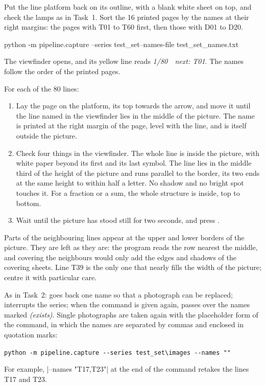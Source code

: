 Put the line platform back on its outline, with a blank white sheet on top, and check the lamps
as in Task~1. Sort the 16 printed pages by the names at their right margins: the pages with T01
to T60 first, then those with D01 to D20.

\label{st:lineseries}
\begin{pswide}
python -m pipeline.capture --series test_set\images --names-file test_set\photo_names.txt
\end{pswide}
The viewfinder opens, and its yellow line reads \emph{1/80\ \ next: T01}. The names follow the
order of the printed pages.

\label{st:oneline}
For each of the 80 lines:
\begin{enumerate}
\item Lay the page on the platform, its top towards the arrow, and move it until the line named
  in the viewfinder lies in the middle of the picture. The name is printed at the right margin
  of the page, level with the line, and is itself outside the picture.
\item Check four things in the viewfinder. The whole line is inside the picture, with white
  paper beyond its first and its last symbol. The line lies in the middle third of the height
  of the picture and runs parallel to the border, its two ends at the same height to within
  half a letter. No shadow and no bright spot touches it. For a fraction or a sum, the whole
  structure is inside, top to bottom.
\item Wait until the picture has stood still for two seconds, and press .
\end{enumerate}
Parts of the neighbouring lines appear at the upper and lower borders of the picture. They are
left as they are: the program reads the row nearest the middle, and covering the neighbours
would only add the edges and shadows of the covering sheets. Line T39 is the only one that
nearly fills the width of the picture; centre it with particular care.

\begin{note}
As in Task~2:  goes back one name so that a photograph can be replaced; 
interrupts the series; when the command is given again,  passes over the names marked
\emph{(exists)}. Single photographs are taken again with the placeholder form of the command,
in which the names are separated by commas and enclosed in quotation marks:
\begin{center}
\mbox{\footnotesize\texttt{python -m pipeline.capture -{}-series test\_set\textbackslash{}images -{}-names "}\texttt{"}}
\end{center}
For example, \code|--names "T17,T23"| at the end of the command retakes the lines T17 and T23.
\end{note}

